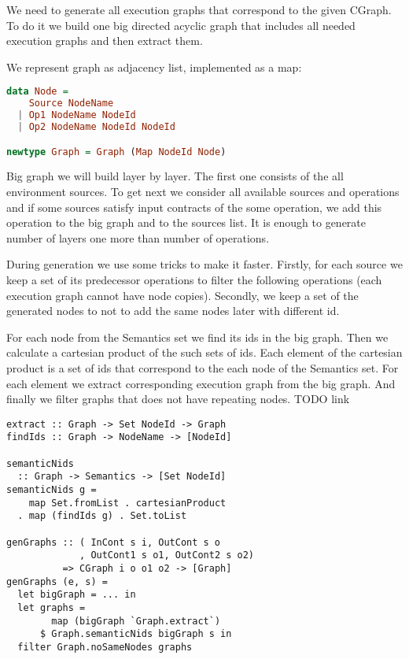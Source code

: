 We need to generate all execution graphs that correspond to the given CGraph.
To do it we build one big directed acyclic graph that includes all needed execution graphs and then extract them.

We represent graph as adjacency list, implemented as a map:

\begin{lstlisting}[language=Haskell]
data Node =
    Source NodeName
  | Op1 NodeName NodeId
  | Op2 NodeName NodeId NodeId

newtype Graph = Graph (Map NodeId Node)
\end{lstlisting}

Big graph we will build layer by layer.
The first one consists of the all environment sources.
To get next we consider all available sources and operations and if some sources satisfy input contracts of the some operation, we add this operation to the big graph and to the sources list.
It is enough to generate number of layers one more than number of operations.

During generation we use some tricks to make it faster.
Firstly, for each source we keep a set of its predecessor operations to filter the following operations (each execution graph cannot have node copies).
Secondly, we keep a set of the generated nodes to not to add the same nodes later with different id.

For each node from the Semantics set we find its ids in the big graph.
Then we calculate a cartesian product of the such sets of ids.
Each element of the cartesian product is a set of ids that correspond to the each node of the Semantics set.
For each element we extract corresponding execution graph from the big graph.
And finally we filter graphs that does not have repeating nodes.
TODO link 

\begin{lstlisting}[languages=Haskell]
extract :: Graph -> Set NodeId -> Graph
findIds :: Graph -> NodeName -> [NodeId]

semanticNids 
  :: Graph -> Semantics -> [Set NodeId]
semanticNids g = 
    map Set.fromList . cartesianProduct 
  . map (findIds g) . Set.toList

genGraphs :: ( InCont s i, OutCont s o
             , OutCont1 s o1, OutCont2 s o2) 
          => CGraph i o o1 o2 -> [Graph]
genGraphs (e, s) = 
  let bigGraph = ... in
  let graphs = 
        map (bigGraph `Graph.extract`) 
      $ Graph.semanticNids bigGraph s in
  filter Graph.noSameNodes graphs
\end{lstlisting}
